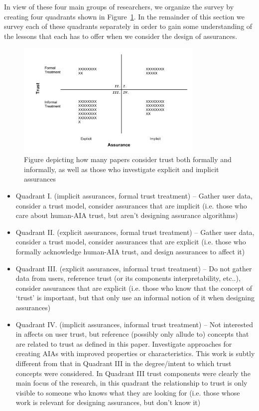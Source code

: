 In view of these four main groups of researchers, we organize the survey by creating four quadrants shown in Figure~\ref{fig:trust_assurance_intention}. In the remainder of this section we survey each of these quadrants separately in order to gain some understanding of the lessons that each has to offer when we consider the design of assurances.

\begin{figure}[htbp]
    \centering
    \includegraphics[width=0.8\textwidth]{Figures/Trust_vs_Assurance_Intention.pdf}
    \caption{Figure depicting how many papers consider trust both formally and informally, as well as those who investigate explicit and implicit assurances}
    \label{fig:trust_assurance_intention}
\end{figure}

\begin{itemize}
    \item Quadrant I. (implicit assurances, formal trust treatment) -- Gather user data, consider a trust model, consider assurances that are implicit (i.e. those who care about human-AIA trust, but aren't designing assurance algorithms)
    \item Quadrant II. (explicit assurances, formal trust treatment) -- Gather user data, consider a trust model, consider assurances that are explicit (i.e. those who formally acknowledge human-AIA trust, and design assurances to affect it)
    \item Quadrant III. (explicit assurances, informal trust treatment) -- Do not gather data from users, reference trust (or its components interpretability, etc..), consider assurances that are explicit (i.e. those who know that the concept of `trust' is important, but that only use an informal notion of it when designing assurances)
    \item Quadrant IV. (implicit assurances, informal trust treatment) -- Not interested in affects on user trust, but reference (possibly only allude to) concepts that are related to trust as defined in this paper. Investigate approaches for creating AIAs with improved properties or characteristics. This work is subtly different from that in Quadrant III in the degree/intent to which trust concepts were considered. In Quadrant III trust components were clearly the main focus of the research, in this quadrant the relationship to trust is only visible to someone who knows what they are looking for (i.e. those whose work is relevant for designing assurances, but don't know it)
\end{itemize}





